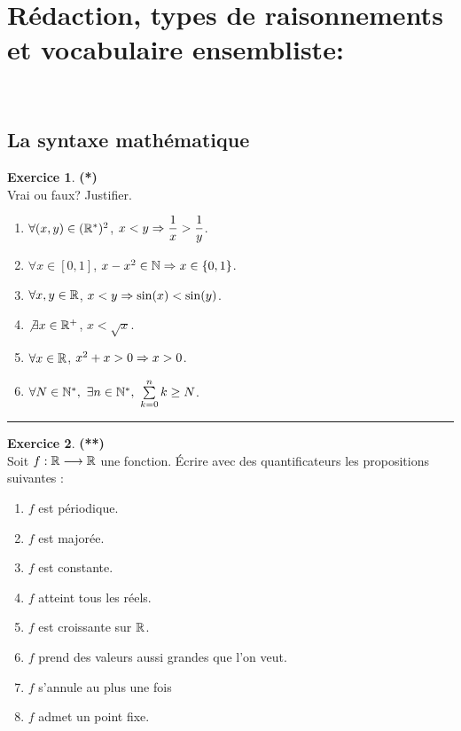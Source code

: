 \documentclass[a4paper,11pt]{article}
\theoremstyle{definition}
\newtheorem{exo}{Exercice} %
\begin{document}
 	
	

\noindent{}
\bigskip




\section*{Rédaction, types de raisonnements et vocabulaire ensembliste:}\hfill\\%
\begin{minipage}{1\linewidth}
	\begin{minipage}[t]{0.48\linewidth}
		\raggedright
	
		
\subsection*{La syntaxe mathématique}
\begin{exo}\textbf{(*)}\quad\\[0.2cm]
	Vrai ou faux? Justifier. 
	\begin{enumerate}
		\item $\forall (x,y)\in (\mathbb{R}^*)^2$,  $x<y\Large\Rightarrow \dfrac{1}{x}> \dfrac{1}{y}$.
		\item $\forall x\in[0,1]$,  $x-x^2 \in\mathbb{N} \Large\Rightarrow x\in\{0,1\}$.
		
		\item $\forall x,y\in\mathbb{R}$,  $ x<y \Large\Rightarrow \sin(x)<\sin(y)$.
		\item $\not\exists x\in\mathbb{R}^+$, $x<\sqrt{x}$.
		\item $\forall x \in\mathbb{R}$,  $ x^2+x>0 \Large\Rightarrow x>0$.
		\item $\forall N\in\mathbb{N}^*, \ \exists n\in\mathbb{N}^*, \ \sum\limits_{k=0}^{n}k \geq N$.
	\end{enumerate}
	\centering
	\rule{1\linewidth}{0.6pt}
\end{exo}



\begin{exo}\textbf{(**)}\quad\\[0.2cm]
	Soit $f : \mathbb{R} \longrightarrow \mathbb{R}$ une fonction. Écrire avec des quantificateurs les propositions suivantes :
	\begin{multicols}{2}
		\begin{enumerate}
			\item $f$ est périodique. \item $f$ est majorée.\item $f$ est constante.\item $f$ atteint tous les réels.\item $f$ est croissante sur $\mathbb{R}$.\item $f$ prend des valeurs aussi grandes que l'on veut.\item $f$ s'annule au plus une fois \item $f$ admet un point fixe.
		\end{enumerate}
	\end{multicols}
 

\end{exo}
\end{minipage}
\end{minipage}
\end{document}
